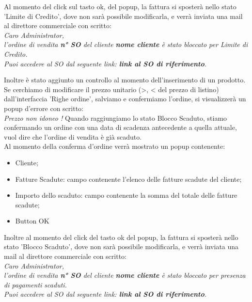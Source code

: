 Al momento del click sul tasto ok, del popup, la fattura si sposterà nello stato 'Limite di Credito', dove non sarà possibile modificarla, e verrà inviata una mail al direttore commerciale con scritto:\vspace*{0.5cm}\\
\textit{Caro Administrator,\\
	l'ordine di vendita \textbf{n° SO} del cliente \textbf{nome cliente} è stato bloccato per Limite di Credito.\\
	Puoi accedere al SO dal seguente link: \textbf{link al SO di riferimento}.}\vspace*{0.5cm}

Inoltre è stato aggiunto un controllo al momento dell'inserimento di un prodotto. Se cerchiamo di modificare il prezzo unitario (>, < del prezzo di listino) dall'interfaccia 'Righe ordine', salviamo e confermiamo l'ordine, si visualizzerà un popup d'errore con scritto:\\ \textit{Prezzo non idoneo !}
\newpage
Quando raggiungiamo lo stato Blocco Scaduto, stiamo confermando un ordine con una data di scadenza antecedente a quella attuale, vuol dire che l'ordine di vendita è già scaduto.\\
Al momento della conferma d'ordine verrà mostrato un popup contenente:\\
\begin{itemize}
	\item Cliente;
	\item Fatture Scadute: campo contenente l'elenco delle fatture scadute del cliente;
	\item Importo dello scaduto: campo contenente la somma del totale delle fatture scadute;
	\item Button OK
\end{itemize}
\newpage
Inoltre al momento del click del tasto ok del popup, la fattura si sposterà nello stato 'Blocco Scaduto', dove non sarà possibile modificarla, e verrà inviata una mail al direttore commerciale con scritto:
\vspace*{0.5cm}\\
\textit{Caro Administrator,\\
l'ordine di vendita \textbf{n° SO} del cliente \textbf{nome cliente} è stato bloccato per presenza di pagamenti scaduti.\\
Puoi accedere al SO dal seguente link: \textbf{link al SO di riferimento}.}


